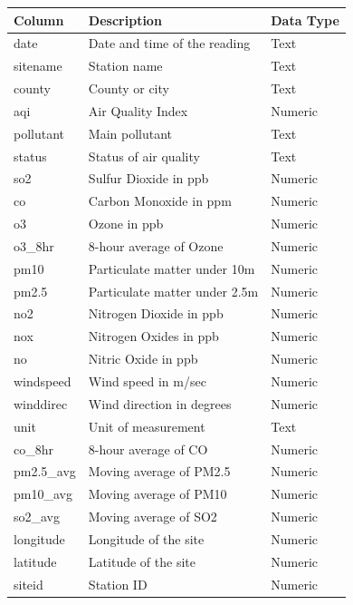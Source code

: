 \documentclass[./report.tex]{subfiles}
\begin{document}
\begin{itemize}
  \begin{table}[h!]
  \centering
  \begin{tabular}{|>{\raggedright\arraybackslash}p{3cm}|p{5cm}|p{3cm}|}
  \hline
  \textbf{Column} & \textbf{Description} & \textbf{Data Type} \\
  \hline
  date       & Date and time of the reading  & Text    \\
  \hline
  sitename   & Station name                  & Text    \\
  \hline
  county     & County or city                & Text    \\
  \hline
  aqi        & Air Quality Index             & Numeric \\
  \hline
  pollutant  & Main pollutant                & Text    \\
  \hline
  status     & Status of air quality         & Text    \\
  \hline
  so2        & Sulfur Dioxide in ppb         & Numeric \\
  \hline
  co         & Carbon Monoxide in ppm        & Numeric \\
  \hline
  o3         & Ozone in ppb                  & Numeric \\
  \hline
  o3\_8hr    & 8-hour average of Ozone       & Numeric \\
  \hline
  pm10       & Particulate matter under 10m  & Numeric \\
  \hline
  pm2.5      & Particulate matter under 2.5m & Numeric \\
  \hline
  no2        & Nitrogen Dioxide in ppb       & Numeric \\
  \hline
  nox        & Nitrogen Oxides in ppb        & Numeric \\
  \hline
  no         & Nitric Oxide in ppb           & Numeric \\
  \hline
  windspeed  & Wind speed in m/sec           & Numeric \\
  \hline
  winddirec  & Wind direction in degrees     & Numeric \\
  \hline
  unit       & Unit of measurement           & Text    \\
  \hline
  co\_8hr    & 8-hour average of CO          & Numeric \\
  \hline
  pm2.5\_avg & Moving average of PM2.5       & Numeric \\
  \hline
  pm10\_avg  & Moving average of PM10        & Numeric \\
  \hline
  so2\_avg   & Moving average of SO2         & Numeric \\
  \hline
  longitude  & Longitude of the site         & Numeric \\
  \hline
  latitude   & Latitude of the site          & Numeric \\
  \hline
  siteid     & Station ID                    & Numeric \\
  \hline
  \end{tabular}
  \label{tab:data_columns}
  \end{table}
\end{itemize}
\end{document}
